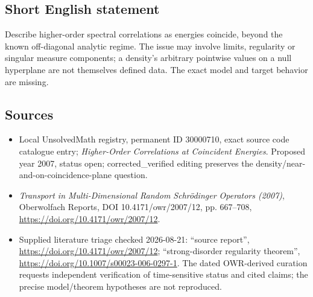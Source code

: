 \documentclass[11pt]{article}
\begin{document}
\subsection{Short English statement}
Describe higher-order spectral correlations as energies coincide, beyond the known off-diagonal analytic regime. The issue may involve limits, regularity or singular measure components; a density's arbitrary pointwise values on a null hyperplane are not themselves defined data. The exact model and target behavior are missing.
\subsection{Sources}
\begin{itemize}
\item Local UnsolvedMath registry, permanent ID 30000710, exact source code catalogue entry; \emph{Higher-Order Correlations at Coincident Energies}. Proposed year 2007, status open; corrected\_verified editing preserves the density/near-and-on-coincidence-plane question.
\item \emph{Transport in Multi-Dimensional Random Schr\"odinger Operators (2007)}, Oberwolfach Reports, DOI 10.4171/owr/2007/12, pp. 667--708, \url{https://doi.org/10.4171/owr/2007/12}.
\item Supplied literature triage checked 2026-08-21: ``source report'', \url{https://doi.org/10.4171/owr/2007/12}; ``strong-disorder regularity theorem'', \url{https://doi.org/10.1007/s00023-006-0297-1}. The dated OWR-derived curation requests independent verification of time-sensitive status and cited claims; the precise model/theorem hypotheses are not reproduced.
\end{itemize}
\end{document}
